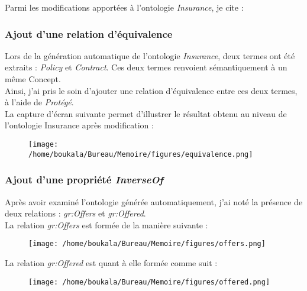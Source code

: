 \documentclass[12pt, a4paper, oneside]{book}
\begin{document}
Parmi les modifications apportées à l'ontologie \emph{Insurance}, je cite : 

\subsubsection{Ajout d'une relation d'équivalence}

Lors de la génération automatique de l'ontologie \emph{Insurance}, deux termes ont été extraits : \emph{Policy} et \emph{Contract}.
Ces deux termes renvoient sémantiquement à un même Concept.\\
Ainsi, j'ai pris le soin d'ajouter une relation  d'équivalence entre ces deux termes, à l'aide de \emph{Protégé}.\\
La capture d'écran suivante permet d'illustrer le résultat obtenu au niveau de l'ontologie Insurance après modification : 

\begin{figure}[h!]
\begin{center}
\texttt{[image: /home/boukala/Bureau/Memoire/figures/equivalence.png]}
\end{center}
\end{figure}


\subsubsection{Ajout d'une propriété \emph{InverseOf}}
Après avoir examiné l'ontologie générée automatiquement, j'ai noté la présence de deux relations : \emph{gr:Offers} et \emph{gr:Offered}.\\
La relation \emph{gr:Offers} est formée de la manière suivante : 

\begin{figure}[h!]
\begin{center}
\texttt{[image: /home/boukala/Bureau/Memoire/figures/offers.png]}
\end{center}
\end{figure}

La relation \emph{gr:Offered} est quant à elle formée comme suit : 

\begin{figure}[h!]
\begin{center}
\texttt{[image: /home/boukala/Bureau/Memoire/figures/offered.png]}
\end{center}
\end{figure}
\end{document}
